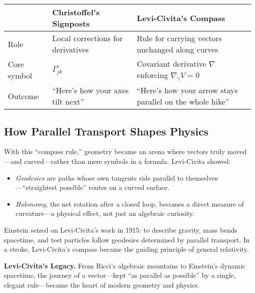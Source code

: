 \bigskip
\begin{tcolorbox}[colback=gray!5!white,colframe=black,title=\textbf{Sidebar: Christoffel’s Notes vs.\ Levi-Civita’s Compass}, fonttitle=\bfseries, arc=1.5mm, boxrule=0.4pt]
    \renewcommand{\arraystretch}{1.2}
    \noindent
    \begin{tabularx}{\linewidth}{>{\raggedright}p{3cm} >{\raggedright}X >{\raggedright\arraybackslash}X}
     & \textbf{Christoffel’s Signposts} & \textbf{Levi-Civita’s Compass} \\
    \midrule
    Role & Local corrections for derivatives & Rule for carrying vectors unchanged along curves \\
    Core symbol & \(\Gamma^i_{jk}\) & Covariant derivative \(\nabla\) enforcing \(\nabla_{\dot\gamma}V=0\) \\
    Outcome & “Here’s how your axes tilt next” & “Here’s how your arrow stays parallel on the whole hike” \\
    \end{tabularx}
\end{tcolorbox}
    

\subsection{How Parallel Transport Shapes Physics}

With this “compass rule,” geometry became an arena where vectors truly moved—and curved—rather than mere symbols in a formula.  Levi-Civita showed:

\begin{itemize}
    \item \emph{Geodesics} are paths whose own tangents ride parallel to themselves—“straightest possible” routes on a curved surface.  
    \item \emph{Holonomy}, the net rotation after a closed loop, becomes a direct measure of curvature—a physical effect, not just an algebraic curiosity.
\end{itemize}

Einstein seized on Levi-Civita’s work in 1915: to describe gravity, mass bends spacetime, and test particles follow geodesics determined by parallel transport.  In a stroke, Levi-Civita’s compass became the guiding principle of general relativity.

\bigskip
\noindent\textbf{Levi-Civita’s Legacy.}  
From Ricci’s algebraic mountains to Einstein’s dynamic spacetime, the journey of a vector—kept “as parallel as possible” by a single, elegant rule—became the heart of modern geometry and physics.  


